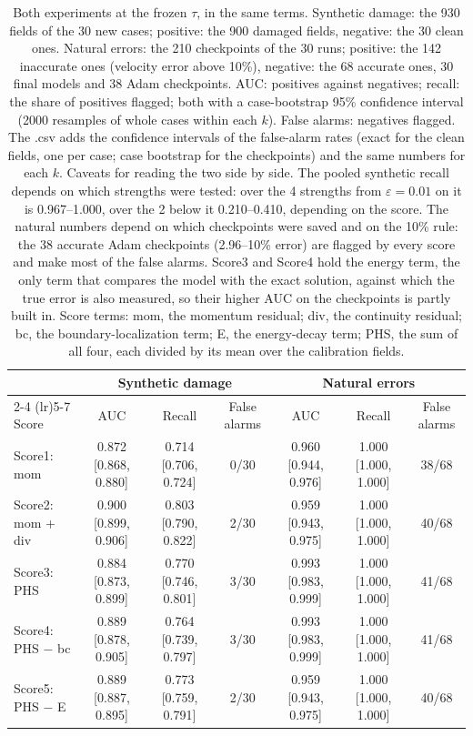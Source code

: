 \begin{table}[tb]
\centering
\footnotesize
\setlength{\tabcolsep}{4pt}
\caption{Both experiments at the frozen $\tau$, in the same terms. Synthetic damage: the 930 fields of the 30 new cases; positive: the 900 damaged fields, negative: the 30 clean ones. Natural errors: the 210 checkpoints of the 30 runs; positive: the 142 inaccurate ones (velocity error above 10\%), negative: the 68 accurate ones, 30 final models and 38 Adam checkpoints. AUC: positives against negatives; recall: the share of positives flagged; both with a case-bootstrap 95\% confidence interval (2000 resamples of whole cases within each $k$). False alarms: negatives flagged. The .csv adds the confidence intervals of the false-alarm rates (exact for the clean fields, one per case; case bootstrap for the checkpoints) and the same numbers for each $k$. Caveats for reading the two side by side. The pooled synthetic recall depends on which strengths were tested: over the 4 strengths from $\varepsilon = 0.01$ on it is 0.967--1.000, over the 2 below it 0.210--0.410, depending on the score. The natural numbers depend on which checkpoints were saved and on the 10\% rule: the 38 accurate Adam checkpoints (2.96--10\% error) are flagged by every score and make most of the false alarms. Score3 and Score4 hold the energy term, the only term that compares the model with the exact solution, against which the true error is also measured, so their higher AUC on the checkpoints is partly built in. Score terms: mom, the momentum residual; div, the continuity residual; bc, the boundary-localization term; E, the energy-decay term; PHS, the sum of all four, each divided by its mean over the calibration fields.}
\label{tab:synthetic_vs_natural}
\begin{tabular}{lcccccc}
\toprule
 & \multicolumn{3}{c}{Synthetic damage} & \multicolumn{3}{c}{Natural errors} \\
\cmidrule(lr){2-4} \cmidrule(lr){5-7}
Score & AUC & Recall & False alarms & AUC & Recall & False alarms \\
\midrule
Score1: mom & 0.872 [0.868, 0.880] & 0.714 [0.706, 0.724] & 0/30 & 0.960 [0.944, 0.976] & 1.000 [1.000, 1.000] & 38/68 \\
Score2: mom + div & 0.900 [0.899, 0.906] & 0.803 [0.790, 0.822] & 2/30 & 0.959 [0.943, 0.975] & 1.000 [1.000, 1.000] & 40/68 \\
Score3: PHS & 0.884 [0.873, 0.899] & 0.770 [0.746, 0.801] & 3/30 & 0.993 [0.983, 0.999] & 1.000 [1.000, 1.000] & 41/68 \\
Score4: PHS $-$ bc & 0.889 [0.878, 0.905] & 0.764 [0.739, 0.797] & 3/30 & 0.993 [0.983, 0.999] & 1.000 [1.000, 1.000] & 41/68 \\
Score5: PHS $-$ E & 0.889 [0.887, 0.895] & 0.773 [0.759, 0.791] & 2/30 & 0.959 [0.943, 0.975] & 1.000 [1.000, 1.000] & 40/68 \\
\bottomrule
\end{tabular}
\end{table}
